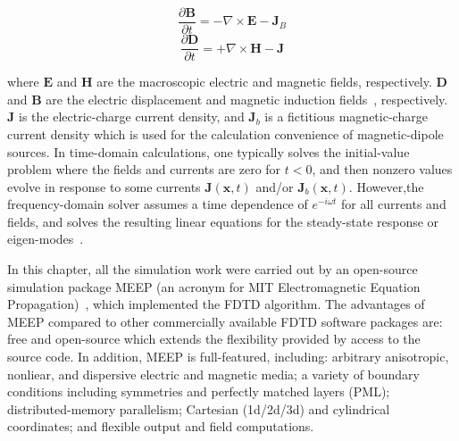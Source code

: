 \begin{equation}
  \frac{\partial\bm{B}}{\partial{t}} = - \nabla \times \bm{E} - \bm{J}_B
\end{equation}
\begin{equation}
  \frac{\partial\bm{D}}{\partial{t}} = + \nabla \times \bm{H} - \bm{J}
\end{equation}

where $\bm{E}$ and $\bm{H}$ are the macroscopic electric and magnetic fields,
respectively. $\bm{D}$ and $\bm{B}$ are the electric displacement and magnetic
induction fields~\cite{jackson1999classical}, respectively. $\bm{J}$ is the
electric-charge current density, and $\bm{J}_b$ is a fictitious magnetic-charge
current density which is used for the calculation convenience of magnetic-dipole
sources. In time-domain calculations, one typically solves the initial-value
problem where the fields and currents are zero for $t < 0$, and then nonzero
values evolve in response to some currents $\bm{J}(\bm{x},t)$ and/or
$\bm{J}_b(\bm{x},t)$. However,the frequency-domain solver assumes a time
dependence of $e^{-i\omega{t}}$ for all currents and fields, and solves the
resulting linear equations for the steady-state response or
eigen-modes~\cite{joannopoulos2011photonic}.

In this chapter, all the simulation work were carried out by an open-source
simulation package MEEP (an acronym for MIT Electromagnetic Equation
Propagation)~\cite{Oskooi:2010fb}, which implemented the FDTD algorithm. The
advantages of MEEP compared to other commercially available FDTD software
packages are: free and open-source which extends the flexibility provided by
access to the source code. In addition, MEEP is full-featured, including:
arbitrary anisotropic, nonliear, and dispersive electric and magnetic media; a
variety of boundary conditions including symmetries and perfectly matched
layers (PML); distributed-memory parallelism; Cartesian (1d/2d/3d) and
cylindrical coordinates; and flexible output and field computations.

